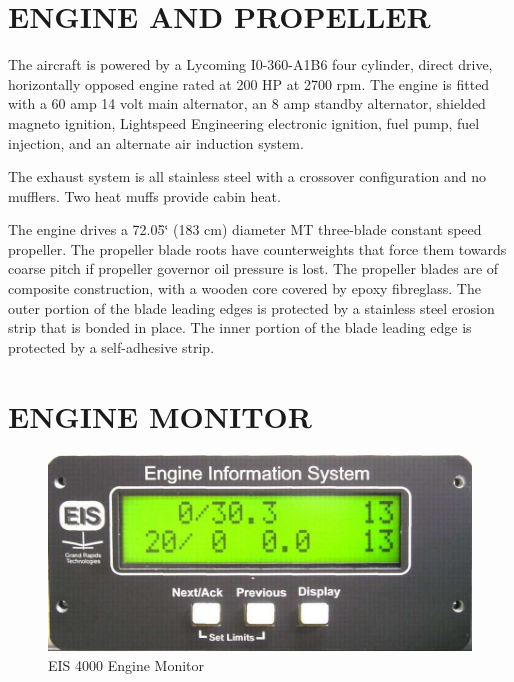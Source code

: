 \section{ENGINE AND PROPELLER}

The aircraft is powered by a Lycoming I0-360-A1B6 four cylinder, direct drive, horizontally opposed engine rated at 200 HP at 2700 rpm. The engine is fitted with a 60 amp 14 volt main alternator, an 8 amp standby alternator, shielded magneto ignition, Lightspeed Engineering electronic ignition, fuel pump, fuel injection, and an alternate air induction system.

The exhaust system is all stainless steel with a crossover configuration and no mufflers. Two heat muffs provide cabin heat.

The engine drives a 72.05\char`\"{} (183 cm) diameter MT three-blade constant speed propeller.  The propeller blade roots have counterweights that force them towards coarse pitch if propeller governor oil pressure is lost.  The propeller blades are of composite construction, with a wooden core covered by epoxy fibreglass.  The outer portion of the blade leading edges is protected by a stainless steel erosion strip that is bonded in place.  The inner portion of the blade leading edge is protected by a self-adhesive strip.

\section{ENGINE MONITOR} 
\begin{figure}
	
	\includegraphics{../Diagrams/eis1} \caption{EIS 4000 Engine Monitor} 
\end{figure}

